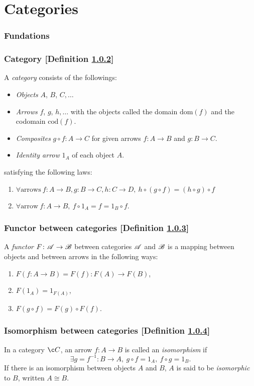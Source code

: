 \newcommand{\sets}{\mathbf{Sets}}
\section{Categories}
\setcounter{subsection}{1}
\subsubsection{Fundations}
\subsubsection{Category [Definition \ref{category}]}\label{category}
A \textit{category} consists of the followings:
\begin{itemize}
\item \textit{Objects} $A$, $B$, $C, \dotsc$
\item \textit{Arrows} $f$, $g$, $h, \dotsc$ with the objects called the domain $\mathrm{dom}(f)$ and the codomain $\mathrm{cod}(f)$.
\item \textit{Composites} $g \circ f \colon A \to C$ for given arrows $f \colon A \to B$ and $g \colon B \to C$.
\item \textit{Identity arrow} $1_A$ of each object $A$.
\end{itemize}
satisfying the following laws:
\begin{enumerate}
\item $\forall \text{arrows}\ f \colon A \to B, g \colon B \to C, h \colon C \to D,\ h \circ (g \circ f) = (h \circ g) \circ f$
\item $\forall \text{arrow}\ f \colon A \to B,\ f \circ 1_A = f = 1_B \circ f$.
\end{enumerate}

\subsubsection{Functor between categories [Definition \ref{functor-between-categories}]}\label{functor-between-categories}
A \textit{functor} $F\colon \mathscr{A} \to \mathscr{B}$ between categories $\mathscr{A}$ and $\mathscr{B}$ is a mapping between objects and between arrows in the following ways:
\begin{enumerate}
\item $F(f\colon A \to B) = F(f) \colon F(A) \to F(B)$,
\item $F(1_A) = 1_{F(A)}$,
\item $F(g \circ f) = F(g) \circ F(f)$.    
\end{enumerate}

\subsubsection{Isomorphism between categories [Definition \ref{isomorphism-between-categories}]}\label{isomorphism-between-categories}
In a category $\c C$, an arrow $f \colon A \to B$ is called an \textit{isomorphism} if
\[
\exists g = f^{-1} \colon B \to A,\ g \circ f = 1_A,\ f \circ g = 1_B.
\]
If there is an isomorphism between objects $A$ and $B$, $A$ is said to be \textit{isomorphic} to $B$, written $A \cong B$.